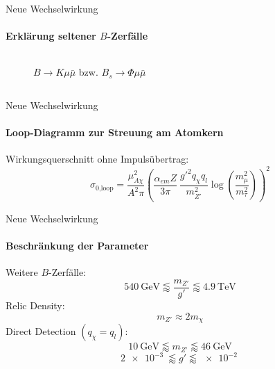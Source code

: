 \begin{frame}{Neue Wechselwirkung}
\framesubtitle{Erklärung seltener $B$-Zerfälle}
\vspace*{-1cm}
\begin{columns}[c]
\begin{column}{.5\textwidth}
\begin{figure}
	\centering
	\resizebox{\textwidth}{!}{
	
	}
	\caption{$B\rightarrow K\mu\bar{\mu}$ bzw. $B_s\rightarrow \Phi\mu\bar{\mu}$}
\end{figure}
\end{column}
\begin{column}{.45\textwidth}
\end{column}
\end{columns}
\end{frame}


\begin{frame}{Neue Wechselwirkung}
\framesubtitle{Loop-Diagramm zur Streuung am Atomkern}
\begin{minipage}{.25\textwidth}
		\resizebox{1.4\textwidth}{!}{
			
		}
\end{minipage}
\hfill
\begin{minipage}{.7\textwidth}
	Wirkungsquerschnitt ohne Impulsübertrag:
	\[ \sigma_\text{0,loop} = \frac{\mu_{A\chi}^2}{A^2\pi}\left(\frac{\alpha_{em}Z}{3\pi}\ \frac{g'^2q_\chi q_l}{m_{Z'}^2}\log\left(\frac{m_\mu^2}{m_\tau^2}\right)\right)^2 \]
\end{minipage}
\end{frame}


\begin{frame}{Neue Wechselwirkung}
\framesubtitle{Beschränkung der Parameter}
Weitere $B$-Zerfälle:
\[ \SI{540}{\giga\electronvolt}\lessapprox\frac{m_{Z'}}{g'}\lessapprox\SI{4.9}{\tera\electronvolt} \]
Relic Density:
	\[ m_{Z'}\approx 2m_\chi \]
Direct Detection $(q_\chi=q_l)$:
	\[ \SI{10}{\giga\electronvolt}\lessapprox m_{Z'} \lessapprox\SI{46}{\giga\electronvolt} \]
	\[ \SI{2e-3}{}\lessapprox g' \lessapprox\SI{e-2}{} \]
\end{frame}